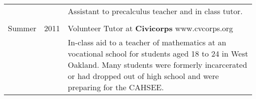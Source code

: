 \documentclass[margin,line,pifont,palatino,courier]{res}
\begin{document}
\begin{resume}
\begin{tabular}{@{}p{0.75in}p{0.5in}p{4in}}
& &  Assistant to precalculus teacher and in class tutor. \\ \\

Summer & 2011 & Volunteer Tutor at {\bf Civicorps} www.cvcorps.org  \\	

& & 		In-class aid to a teacher of mathematics at an vocational school for students aged 18 to 24 in West Oakland.  Many students were formerly incarcerated
or had dropped out of high school and were preparing for the CAHSEE.\\

\end{tabular}

\end{resume}
\end{document}
